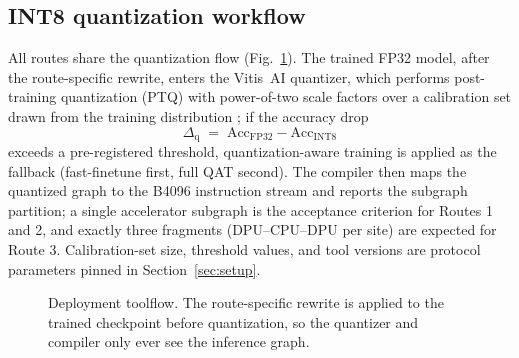 \documentclass[onecolumn,journal]{IEEEtran}
\begin{document}
\subsection{INT8 quantization workflow}\label{sec:quant}
All routes share the quantization flow (Fig.~\ref{fig:toolflow}). The trained FP32
model, after the route-specific rewrite, enters the Vitis~AI quantizer, which performs
post-training quantization (PTQ) with power-of-two scale factors over a calibration set
drawn from the training distribution \cite{amd_ug1414,krishnamoorthi2018quantizing};
if the accuracy drop
\begin{equation}
\Delta_{\mathrm{q}} \;=\; \mathrm{Acc}_{\mathrm{FP32}} - \mathrm{Acc}_{\mathrm{INT8}}
\label{eq:deltaq}
\end{equation}
exceeds a pre-registered threshold, quantization-aware training
\cite{jacob2018quantization} is applied as the fallback (fast-finetune first, full QAT
second). The compiler then maps the quantized graph to the B4096 instruction stream and
reports the subgraph partition; a single accelerator subgraph is the acceptance
criterion for Routes 1 and 2, and exactly three fragments (DPU--CPU--DPU per site) are
expected for Route 3. Calibration-set size, threshold values, and tool versions are
protocol parameters pinned in Section~\ref{sec:setup}.

\begin{figure}[t]
\centering
{}
\caption{Deployment toolflow. The route-specific rewrite is applied to the trained
checkpoint before quantization, so the quantizer and compiler only ever see the
inference graph.}
\label{fig:toolflow}
\end{figure}
\end{document}
